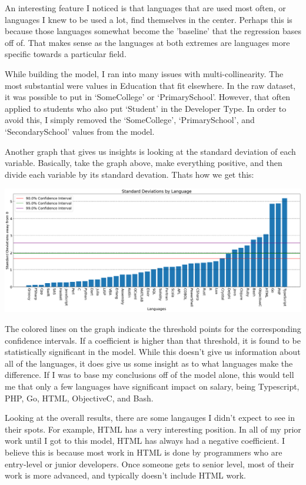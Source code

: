 \documentclass{report}
\begin{document}
An interesting feature I noticed is that languages that are used most often, or languages I knew to be used a lot, find themselves in the center. Perhaps this is because those languages somewhat become the 'baseline' that the regression bases off of. That makes sense as the languages at both extremes are languages more specific towards a particular field.

While building the model, I ran into many issues with multi-collinearity. The most substantial were values in Education that fit elsewhere. In the raw dataset, it was possible to put in `SomeCollege' or `PrimarySchool'. However, that often applied to students who also put `Student' in the Developer Type. In order to avoid this, I simply removed the `SomeCollege', `PrimarySchool', and `SecondarySchool' values from the model.

Another graph that gives us insights is looking at the standard deviation of each variable. Basically, take the graph above, make everything positive, and then divide each variable by its standard devation. Thats how we get this:


\includegraphics[width=0.95\linewidth]{standarddeviations_language.png}

\vspace{0.5in}

The colored lines on the graph indicate the threshold points for the corresponding confidence intervals. If a coefficient is higher than that threshold, it is found to be statistically significant in the model. While this doesn't give us information about all of the languages, it does give us some insight as to what languages make the difference. If I was to base my conclusions off of the model alone, this would tell me that only a few languages have significant impact on salary, being Typescript, PHP, Go, HTML, ObjectiveC,
and Bash.

Looking at the overall results, there are some langauges I didn't expect to see in their spots. For example, HTML has a very interesting position. In all of my prior work until I got to this model, HTML has always had a negative coefficient. I believe this is because most work in HTML is done by programmers who are entry-level or junior developers. Once someone gets to senior level, most of their work is more advanced, and typically doesn't include HTML work.
\end{document}
